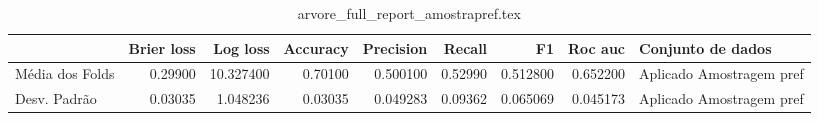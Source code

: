 \begin{table}
\centering
\caption{arvore_full_report_amostrapref.tex}
\label{arvore_full_report_amostrapref.tex}
\begin{tabular}{lrrrrrrrl}
\toprule
{}              &  Brier  loss &   Log loss &  Accuracy  &  Precision  &  Recall  &       F1  &  Roc auc  &         Conjunto de dados \\
\midrule
Média dos Folds &      0.29900 &  10.327400 &    0.70100 &    0.500100 &  0.52990 &  0.512800 &  0.652200 &  Aplicado Amostragem pref \\
Desv. Padrão    &      0.03035 &   1.048236 &    0.03035 &    0.049283 &  0.09362 &  0.065069 &  0.045173 &  Aplicado Amostragem pref \\
\bottomrule
\end{tabular}
\end{table}
